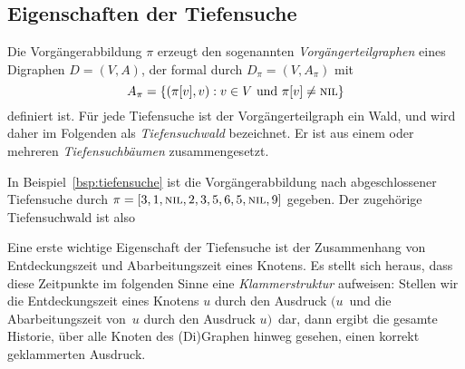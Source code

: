 \subsection{Eigenschaften der Tiefensuche}

\begin{defn} 
Die Vorgängerabbildung $\pi$ erzeugt den sogenannten \emph{Vorgängerteilgraphen} eines Digraphen $D=(V,A)$, der formal durch $D_\pi=(V,A_\pi)$ mit
\[
A_\pi = \left\{(\pi[v],v) : v \in V \text{ und } \pi[v] \neq \mathop{\text{\textsc{nil}}}\right\}
\]
definiert ist.
Für jede Tiefensuche ist der Vorgängerteilgraph ein Wald, und wird daher im Folgenden als \emph{Tiefensuchwald} bezeichnet.
Er ist aus einem oder mehreren \emph{Tiefensuchbäumen} zusammengesetzt.
\end{defn} 

\begin{bsp} 
In Beispiel~\ref{bsp:tiefensuche} ist die Vorgängerabbildung nach abgeschlossener Tiefensuche durch $\pi=[3,1,\mathop{\text{\textsc{nil}}},2,3,5,6,5,\mathop{\text{\textsc{nil}}},9]$ gegeben.
Der zugehörige Tiefensuchwald ist also

\hfill
{}
\end{bsp} 

\begin{bem}
Eine erste wichtige Eigenschaft der Tiefensuche ist der Zusammenhang von Entdeckungszeit und Abarbeitungszeit eines Knotens.
Es stellt sich heraus, dass diese Zeitpunkte im folgenden Sinne eine \emph{Klammerstruktur} aufweisen:
Stellen wir die Entdeckungszeit eines Knotens $u$ durch den Ausdruck \glqq $(u$\grqq\ und die Abarbeitungszeit von~$u$ durch den Ausdruck \glqq $u)$\grqq\ dar, dann ergibt die gesamte Historie, über alle Knoten des (Di)Graphen hinweg gesehen, einen korrekt geklammerten Ausdruck.
\end{bem} 

